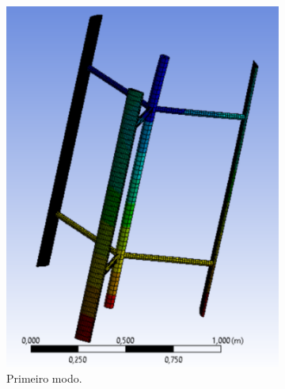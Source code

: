 \begin{figure}	
	\caption{Modos de vibração do sistema com eixo e braço maciços.}
	\label{fig:resultmodomacico}
	\begin{subfigure}{0.5\textwidth}
		\centering
		\includegraphics[width=1.0\textwidth]{figuras/resultmodalmacico1.pdf}
		\caption{Primeiro modo.}
		\label{subfig:resultmodomacicomodo1}
	\end{subfigure}
	\begin{subfigure}{0.5\textwidth}
		\centering

\end{subfigure}
\end{figure}
